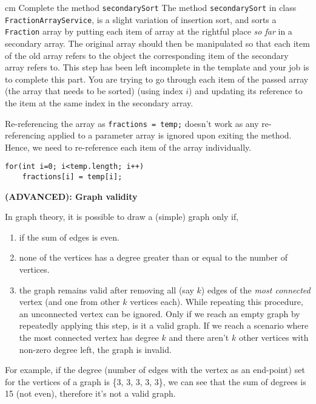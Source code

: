\begin{questions}
 cm \question Complete the method \texttt{secondarySort} \vskip 0.5cm
The method \texttt{secondarySort} in class \texttt{FractionArrayService}, is a slight variation of insertion sort, and sorts a \texttt{Fraction} array by putting each item of array at the rightful place \emph{so far} in a secondary array. The original array should then be manipulated so that each item of the old array refers to the object the corresponding item of the secondary array refers to. This step has been left incomplete in the template and your job is to complete this part. You are trying to go through each item of the passed array (the array that needs to be sorted) (using index $i$) and updating its reference to the item at the same index in the secondary array.

\begin{solution}
Re-referencing the array as \texttt{fractions = temp;} doesn't work as any re-referencing applied to a parameter array is ignored upon exiting the method. Hence, we need to re-reference each item of the array individually.
\begin{lstlisting}
for(int i=0; i<temp.length; i++)
	fractions[i] = temp[i];
\end{lstlisting}
\end{solution}

\question \textbf{(ADVANCED): Graph validity} \vskip 0.5cm

In graph theory, it is possible to draw a (simple) graph only if,

\begin{enumerate}
\item if the sum of edges is even.
\item none of the vertices has a degree greater than or equal to the number of vertices.
\item the graph remains valid after removing all (say $k$) edges of the \emph{most connected} vertex (and one from other $k$ vertices each). While repeating this procedure, an unconnected vertex can be ignored. Only if we reach an empty graph by repeatedly applying this step, is it a valid graph. If we reach a scenario where the most connected vertex has degree $k$ and there aren't $k$ other vertices with non-zero degree left, the graph is invalid.
\end{enumerate}

For example, if the degree (number of edges with the vertex as an end-point) set for the vertices of a graph is \{3, 3, 3, 3, 3\}, we can see that the sum of degrees is 15 (not even), therefore it's not a valid graph.


\end{questions}
